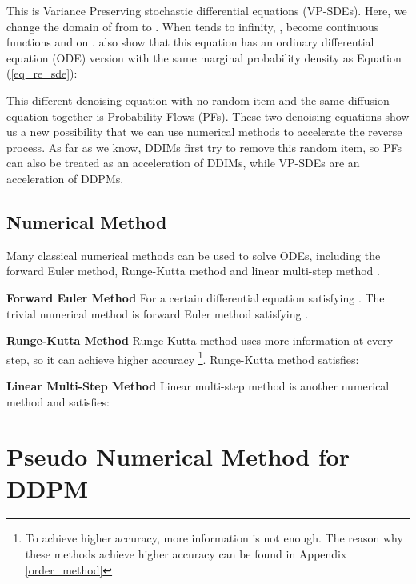 \documentclass{article}
\begin{document}
This is Variance Preserving stochastic differential equations (VP-SDEs). Here, we change the domain of  from  to . When  tends to infinity, ,  become continuous functions  and  on . \citet{Song2020} also show that this equation has an ordinary differential equation (ODE) version with the same marginal probability density as Equation (\ref{eq_re_sde}):

This different denoising equation with no random item and the same diffusion equation together is Probability Flows (PFs). These two denoising equations show us a new possibility that we can use numerical methods to accelerate the reverse process. As far as we know, DDIMs first try to remove this random item, so PFs can also be treated as an acceleration of DDIMs, while VP-SDEs are an acceleration of DDPMs.

\subsection{Numerical Method}
\label{sec_num_method}

Many classical numerical methods can be used to solve ODEs, including the forward Euler method, Runge-Kutta method and linear multi-step method \citep{Sauer2017}.

\textbf{Forward Euler Method} For a certain differential equation satisfying . The trivial numerical method is forward Euler method satisfying . 

\textbf{Runge-Kutta Method} Runge-Kutta method uses more information at every step, so it can achieve higher accuracy \footnote{To achieve higher accuracy, more information is not enough. The reason why these methods achieve higher accuracy can be found in Appendix \ref{order_method}}.
Runge-Kutta method satisfies:


\textbf{Linear Multi-Step Method} Linear multi-step method is another numerical method and satisfies:



\section{Pseudo Numerical Method for DDPM}
\label{fast_method}
\end{document}

